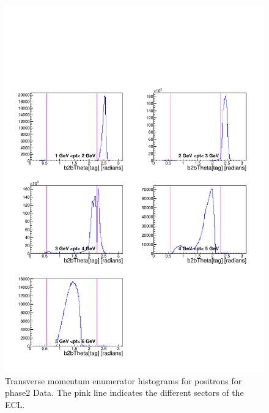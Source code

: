 \documentclass[a4paper,11pt,twosided,final,german,openbib,pdftex,listof=totoc,bibliography=totoc]{scrbook}
\begin{document}
\begin{appendix}
\begin{figure}[!htbp]
	\centering
	\includegraphics[width=\textwidth]{Plots/master/xPtMThetaepE_Data}
	\caption[Transverse Momentum $\theta$ Positron Enumerator Histogram Phase2 Data]{Transverse momentum enumerator histograms for positrons for phase2 Data. The pink line indicates the different sectors of the ECL.}
	\label{plt:PtMThetaepE_Data}
\end{figure}



\end{appendix}
\end{document}
